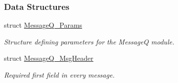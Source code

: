 \subsubsection*{Data Structures}
\begin{DoxyCompactItemize}
\item 
struct \hyperlink{struct_message_q___params}{MessageQ\_\-Params}
\begin{DoxyCompactList}\small\item\em Structure defining parameters for the MessageQ module. \item\end{DoxyCompactList}\item 
struct \hyperlink{struct_message_q___msg_header}{MessageQ\_\-MsgHeader}
\begin{DoxyCompactList}\small\item\em Required first field in every message. \item\end{DoxyCompactList}\end{DoxyCompactItemize}

